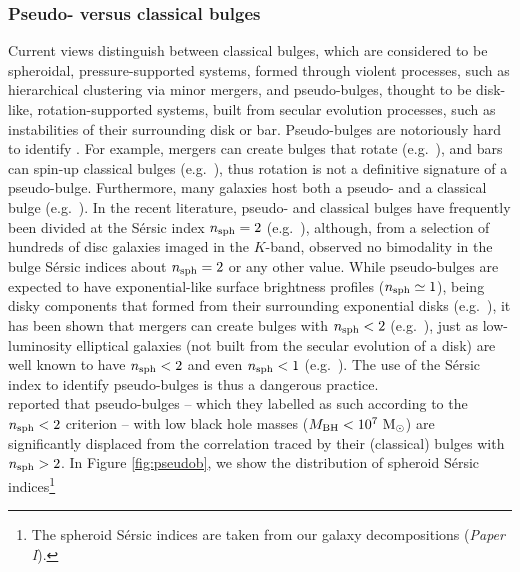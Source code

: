 \documentclass[preprint2]{emulateapj}
\begin{document}
\subsubsection{Pseudo- versus classical bulges}
Current views distinguish between classical bulges, which are considered to be spheroidal, pressure-supported systems, 
formed through violent processes, such as hierarchical clustering via minor mergers, 
and pseudo-bulges, thought to be disk-like, rotation-supported systems, 
built from secular evolution processes, such as instabilities of their surrounding disk or bar. 
Pseudo-bulges are notoriously hard to identify \citep{graham2013review,graham2014review,graham2015pseudo,graham2015review}.
For example, mergers can create bulges that rotate (e.g.~\citealt{bekki2010,keselmannusser2012}), 
and bars can spin-up classical bulges (e.g.~\citealt{saha2012}), 
thus rotation is not a definitive signature of a pseudo-bulge. 
Furthermore, many galaxies host both a pseudo- and a classical bulge (e.g.~\citealt{erwin2003,erwin2015,athanassoula2005,Gadotti2009,
macarthur2009,dosanjosdasilva2013,seidel2015}). 
In the recent literature, pseudo- and classical bulges have frequently been divided at the 
S\'ersic index $n_{\rm sph}=2$ (e.g.~\citealt{sani2011,beifiori2012}), 
although, from a selection of hundreds of disc galaxies imaged in the $K$-band, 
\cite{grahamworley2008} observed no bimodality in the bulge S\'ersic indices about $n_{\rm sph}=2$ or any other value. 
While pseudo-bulges are expected to have exponential-like surface brightness profiles ($n_{\rm sph} \simeq 1$), 
being disky components that formed from their surrounding exponential disks 
(e.g.~\citealt{bardeen1975,hohl1975,combessanders1981,combes1990,pfennigerfriedli1991}), 
it has been shown that mergers can create bulges with $n_{\rm sph}<2$
(e.g.~\citealt{elichemoral2011,scannapieco2011,querejeta2015}), 
just as low-luminosity elliptical galaxies (not built from the secular evolution of a disk)
are well known to have $n_{\rm sph}<2$ and even $n_{\rm sph}<1$ (e.g.~\citealt{davies1988,youngcurrie1994,jerjen2000}). 
The use of the S\'ersic index to identify pseudo-bulges is thus a dangerous practice. \\
\cite{sani2011} reported that pseudo-bulges -- which they labelled as such according to the $n_{\rm sph}<2$ criterion -- 
with low black hole masses ($M_{\rm BH} < 10^7\rm~M_\odot$) are significantly displaced from the correlation 
traced by their (classical) bulges with $n_{\rm sph}>2$. 
In Figure \ref{fig:pseudob}, we show the distribution of spheroid S\'ersic indices\footnote{The spheroid S\'ersic indices 
are taken from our galaxy decompositions (\emph{Paper I}).} 
\end{document}
